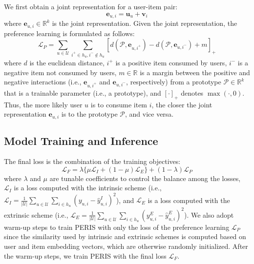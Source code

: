 \documentclass[sigconf]{acmart}
\newcommand{\MD}{{\small\textsf{PERIS}}}
\begin{document}
We first obtain a joint representation for a user-item pair:
\begin{equation*}
    \textbf{e}_{u,i} = \textbf{u}_u + \textbf{v}_i
\end{equation*}
where $\textbf{e}_{u,i} \in \mathbb{R}^k$ is the joint representation. Given the joint representation, the preference learning is formulated as follows:
\begin{equation*}
    \mathcal{L}_{P} = \sum_{u \in \mathcal{U}} \sum_{i^+ \in h_u, i^- \notin h_u} [d(\mathcal{P}, \textbf{e}_{u,i^+}) - d(\mathcal{P}, \textbf{e}_{u,i^-})+m]_+
\end{equation*}
where $d$ is the euclidean distance, $i^+$ is a positive item consumed by users, $i^-$ is a negative item not consumed by users, $m \in \mathbb{R}$ is a margin between the positive and negative interactions (i.e., $\textbf{e}_{u,i^+}$ and $\textbf{e}_{u,i^-}$, respectively) from a prototype $\mathcal{P} \in \mathbb{R}^k$ that is a trainable parameter (i.e., a prototype), and $[\cdot]_+$ denotes $\max(\cdot,0)$. 
Thus, the more likely user $u$ is to consume item $i$, the closer the joint representation $\textbf{e}_{u,i}$ is to the prototype $\mathcal{P}$, and vice versa.



\subsection{Model Training and Inference}
\label{sec:loss}
The final loss is the combination of the training objectives:
\begin{equation}
    \mathcal{L}_F = \lambda \bigl \{\mu \mathcal{L}_{I} + (1-\mu)\mathcal{L}_{E}\bigr\} + (1-\lambda) \mathcal{L}_{P} 
    \label{eqn:final_loss}
\end{equation}
where $\lambda$ and  $\mu$ are tunable coefficients to control the balance among the losses, $\mathcal{L}_I$ is a loss computed with the intrinsic scheme (i.e., $\mathcal{L}_I = \frac{1}{|\mathcal{U}|} \sum_{u\in \mathcal{U}} \sum_{i\in h_u} (y_{u,i} - \hat{y}_{u,i}^I)^2$), and $\mathcal{L}_E$ is a loss computed with the extrinsic scheme (i.e., $\mathcal{L}_E = \frac{1}{|\mathcal{U}|} \sum_{u\in \mathcal{U}} \sum_{i\in h_u} (y_{u,i}^E - \hat{y}_{u,i}^E)^2$).
We also adopt warm-up steps to train \MD{} with only the loss of the preference learning $\mathcal{L}_{P}$ since the similarity used by intrinsic and extrinsic schemes is computed based on user and item embedding vectors, which are otherwise randomly initialized. After the warm-up steps, we train \MD{} with the final loss $\mathcal{L}_F$.
\end{document}
